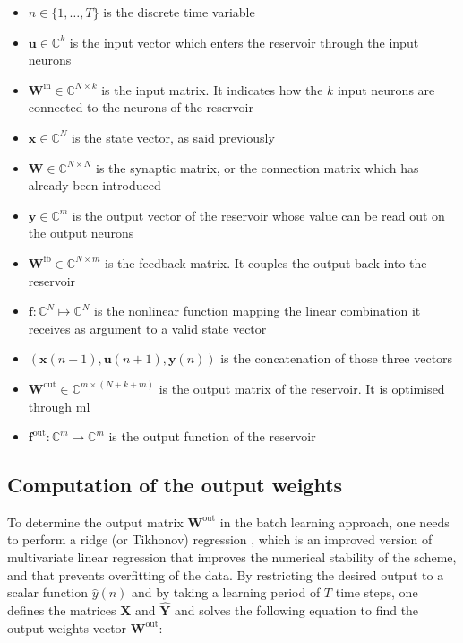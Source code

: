 \begin{itemize}
	\item $n \in \{1, \dots, T\}$ is the discrete time variable
	\item $\mathbf{u} \in \mathbb{C}^k$ is the input vector which enters the reservoir through the input neurons
	\item $\mathbf{W}^{\text{in}} \in \mathbb{C}^{N \times k}$ is the input matrix. It indicates how the $k$ input neurons are connected to the neurons of the reservoir
	\item $\mathbf{x} \in \mathbb{C}^{N}$ is the state vector, as said previously
	\item $\mathbf{W} \in \mathbb{C}^{N \times N}$ is the synaptic matrix, or the connection matrix which has already been introduced
	\item $\mathbf{y} \in \mathbb{C}^{m}$ is the output vector of the reservoir whose value can be read out on the output neurons
	\item $\mathbf{W}^{\text{fb}} \in \mathbb{C}^{N \times m}$ is the feedback matrix. It couples the output back into the reservoir
	\item $\mathbf{f}: \mathbb{C}^N \mapsto \mathbb{C}^N$ is the nonlinear function mapping the linear combination it receives as argument to a valid state vector
	\item $\left(\mathbf{x}(n+1), \mathbf{u}(n+1), \mathbf{y}(n)\right)$ is the concatenation of those three vectors
	\item $\mathbf{W}^{\text{out}} \in \mathbb{C}^{m \times (N+k+m)}$ is the output matrix of the reservoir. It is optimised through \gls{ml}
	\item $\mathbf{f}^{\text{out}} : \mathbb{C}^{m} \mapsto \mathbb{C}^{m}$ is the output function of the reservoir
\end{itemize}


\subsection{Computation of the output weights}

\label{subsec-rc-training}

To determine the output matrix $\mathbf{W}^{\text{out}}$ in the batch learning approach, one needs to perform a ridge (or Tikhonov) regression \cite{NIPS2010_4056}, which is an improved version of multivariate linear regression that improves the numerical stability of the scheme, and that prevents overfitting of the data. By restricting the desired output to a scalar function $\hat{y}(n)$ and by taking a learning period of $T$ time steps, one defines the matrices $\mathbf{X}$ and $\hat{\mathbf{Y}}$ and solves the following equation to find the output weights vector $\mathbf{W}^{\text{out}}$:

